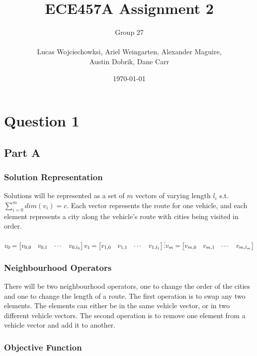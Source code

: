 \documentclass[a4paper]{article}
\title{ECE457A Assignment 2}
\author{
  Group 27 \\
  \\
  Lucas Wojciechowksi, Ariel Weingarten, Alexander Maguire, \\
  Austin Dobrik, Dane Carr}
\date{\today}
\begin{document}
\maketitle

\section{Question 1}

\subsection{Part A}

\subsubsection{Solution Representation}

Solutions will be represented as a set of $m$ vectors of varying length $l_{i}$ s.t. $\sum_{i=0}^{m}dim(v_{i}) = c$.
Each vector represents the route for one vehicle, and each element represents a city along the vehicle's route with cities being visited in order.

$v_{0} = \begin{bmatrix}
v_{0,0} & v_{0,1} & \cdots & v_{0,l_{0}}
\end{bmatrix} \\
v_{1} = \begin{bmatrix}
v_{1,0} & v_{1,1} & \cdots & v_{1,l_{1}}
\end{bmatrix} \\
\vdots \\
v_{m} = \begin{bmatrix}
v_{m,0} & v_{m,1} & \cdots & v_{m,l_{m}}
\end{bmatrix}$

\subsubsection{Neighbourhood Operators}

There will be two neighbourhood operators, one to change the order of the cities and one to change the length of a route.  The first operation is
to swap any two elements.  The elements can either be in the same vehicle vector, or in two different vehicle vectors.  The second operation is to
remove one element from a vehicle vector and add it to another.

\subsubsection{Objective Function}
\end{document}

